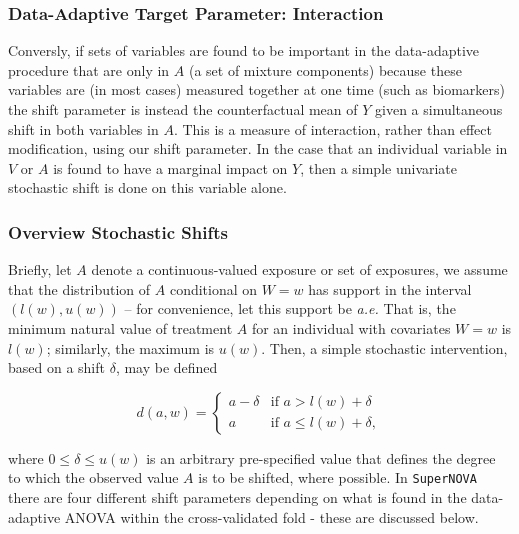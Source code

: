 \documentclass[
]{article}
\begin{document}
\hypertarget{data-adaptive-target-parameter-interaction}{%
\subsubsection{Data-Adaptive Target Parameter:
Interaction}\label{data-adaptive-target-parameter-interaction}}

Conversly, if sets of variables are found to be important in the
data-adaptive procedure that are only in \(A\) (a set of mixture
components) because these variables are (in most cases) measured
together at one time (such as biomarkers) the shift parameter is instead
the counterfactual mean of \(Y\) given a simultaneous shift in both
variables in \(A\). This is a measure of interaction, rather than effect
modification, using our shift parameter. In the case that an individual
variable in \(V\) or \(A\) is found to have a marginal impact on \(Y\),
then a simple univariate stochastic shift is done on this variable
alone.

\hypertarget{overview-stochastic-shifts}{%
\subsubsection{Overview Stochastic
Shifts}\label{overview-stochastic-shifts}}

Briefly, let \(A\) denote a continuous-valued exposure or set of
exposures, we assume that the distribution of \(A\) conditional on
\(W = w\) has support in the interval \((l(w), u(w))\) -- for
convenience, let this support be \emph{a.e.} That is, the minimum
natural value of treatment \(A\) for an individual with covariates
\(W = w\) is \(l(w)\); similarly, the maximum is \(u(w)\). Then, a
simple stochastic intervention, based on a shift \(\delta\), may be
defined

\begin{equation}\label{eqn:shift}
  d(a, w) =
  \begin{cases}
    a - \delta & \text{if } a > l(w) + \delta \\
    a & \text{if } a \leq l(w) + \delta,
  \end{cases}
\end{equation}

where \(0 \leq \delta \leq u(w)\) is an arbitrary pre-specified value
that defines the degree to which the observed value \(A\) is to be
shifted, where possible. In \texttt{SuperNOVA} there are four different
shift parameters depending on what is found in the data-adaptive ANOVA
within the cross-validated fold - these are discussed below.
\end{document}
